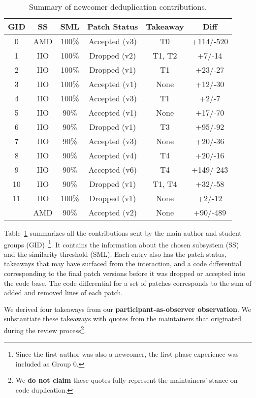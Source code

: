 \documentclass[10pt,conference]{IEEEtran}
\begin{document}
\begin{table}[ht]
\centering
\caption{Summary of newcomer deduplication contributions.}
\begin{tabular}{ |c |c |c |c |c | c| }
\hline
\textbf{GID} & \textbf{SS} & \textbf{SML} & \textbf{Patch Status} & \textbf{Takeaway} & \textbf{Diff} \\
\hline
0 & AMD & 100\% & Accepted (v3) & T0 & +114/-520 \\ \hline
1 & IIO & 100\% & Dropped (v2) & T1, T2 & +7/-14 \\ \hline
2 & IIO & 100\% & Dropped (v1) & T1 & +23/-27 \\ \hline
3 & IIO & 100\% & Accepted (v1) & None & +12/-30 \\ \hline
4 & IIO & 100\% & Accepted (v3) & T1 & +2/-7 \\ \hline
5 & IIO & 90\% & Accepted (v1) & None & +17/-70 \\ \hline
6 & IIO & 90\% & Dropped (v1) & T3 & +95/-92 \\ \hline
7 & IIO & 90\% & Accepted (v3) & None & +20/-36 \\ \hline
8 & IIO & 90\% & Accepted (v4) & T4 & +20/-16 \\ \hline
9 & IIO & 90\% & Accepted (v6) & T4 & +149/-243 \\ \hline
10 & IIO & 90\% & Dropped (v1) & T1, T4 & +32/-58 \\ \hline
11 & IIO & 100\% & Dropped (v1) & None & +2/-12 \\
   & AMD & 90\% & Accepted (v2) & None & +90/-489 \\ \hline

\end{tabular}%

\label{tab:stu}
\end{table}

Table~\ref{tab:stu} summarizes all the contributions sent by the main author and student groups (GID)~\footnote{Since the first author was also a newcomer, the first phase experience was included as Group 0.}. It contains the information about the chosen subsystem (SS) and the similarity threshold (SML). Each entry also has the patch status, takeaways that may have surfaced from the interaction, and a code differential corresponding to the final patch versions before it was dropped or accepted into the code base. The code differential for a set of patches corresponds to the sum of added and removed lines of each patch.

We derived four takeaways from our \textbf{participant-as-observer observation}. We substantiate these takeaways with quotes from the maintainers that originated during the review process\footnote{We \textbf{do not claim} these quotes fully represent the maintainers’ stance on code duplication.}.
\end{document}
